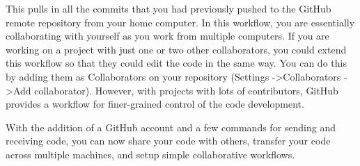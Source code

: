 This pulls in all the commits that you had previously pushed to the GitHub remote repository from your home computer.
In this workflow, you are essentially collaborating with yourself as you work from multiple computers.
If you are working on a project with just one or two other collaborators, you could extend this workflow so that they could edit the code in the same way.
You can do this by adding them as Collaborators on your repository (Settings -\textgreater Collaborators -\textgreater Add collaborator).
However, with projects with lots of contributors, GitHub provides a workflow for finer-grained control of the code development.

With the addition of a GitHub account and a few commands for sending and receiving code, you can now share your code with others, transfer your code across multiple machines, and setup simple collaborative workflows.
